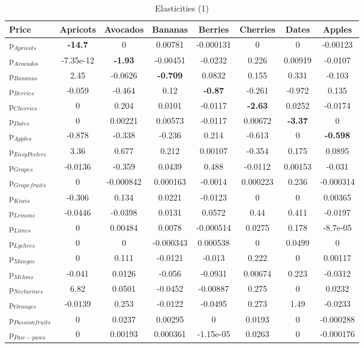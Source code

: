\documentclass[11pt]{article}
\begin{document}
\begin{table}[h]
\caption{Elasticities (1)}
\label{table:elasticities 1}
\begin{center}
\begin{tabular}{lccccccc} \hline \hline
Price &Apricots &Avocados &Bananas &Berries &Cherries &Dates &Apples \\ \hline
p$_{Apricots}$ &\textbf{-14.7} &0 &0.00781 &-0.000131 &0 &0 &-0.00123 \\
p$_{Avocados}$ &-7.35e-12 &\textbf{-1.93} &-0.00451 &-0.0232 &0.226 &0.00919 &-0.0107 \\
p$_{Bananas}$ &2.45 &-0.0626 &\textbf{-0.709} &0.0832 &0.155 &0.331 &-0.103 \\
p$_{Berries}$ &-0.059 &-0.464 &0.12 &\textbf{-0.87} &-0.261 &-0.972 &0.135 \\
p$_{Cherries}$ &0 &0.204 &0.0101 &-0.0117 &\textbf{-2.63} &0.0252 &-0.0174 \\
p$_{Dates}$ &0 &0.00221 &0.00573 &-0.0117 &0.00672 &\textbf{-3.37} &0 \\
p$_{Apples}$ &-0.878 &-0.338 &-0.236 &0.214 &-0.613 &0 &\textbf{-0.598} \\
p$_{Easy Peelers}$ &3.36 &0.677 &0.212 &0.00107 &-0.354 &0.175 &0.0895 \\
p$_{Grapes}$ &-0.0136 &-0.359 &0.0439 &0.488 &-0.0112 &0.00153 &-0.031 \\
p$_{Grapefruits}$ &0 &-0.000842 &0.000163 &-0.0014 &0.000223 &0.236 &-0.000314 \\
p$_{Kiwis}$ &-0.306 &0.134 &0.0221 &-0.0123 &0 &0 &0.00365 \\
p$_{Lemons}$ &-0.0446 &-0.0398 &0.0131 &0.0572 &0.44 &0.411 &-0.0197 \\
p$_{Limes}$ &0 &0.00484 &0.0078 &-0.000514 &0.0275 &0.178 &-8.7e-05 \\
p$_{Lychees}$ &0 &0 &-0.000343 &0.000538 &0 &0.0499 &0 \\
p$_{Mangos}$ &0 &0.111 &-0.0121 &-0.013 &0.222 &0 &0.00117 \\
p$_{Melons}$ &-0.041 &0.0126 &-0.056 &-0.0931 &0.00674 &0.223 &-0.0312 \\
p$_{Nectarines}$ &6.82 &0.0501 &-0.0452 &-0.00887 &0.275 &0 &0.0232 \\
p$_{Oranges}$ &-0.0139 &0.253 &-0.0122 &-0.0495 &0.273 &1.49 &-0.0233 \\
p$_{Passion fruits}$ &0 &0.0237 &0.00295 &0 &0.0193 &0 &-0.000288 \\
p$_{Paw-paws}$ &0 &0.00193 &0.000361 &-1.15e-05 &0.0263 &0 &-0.000176 \\

\end{tabular}
\end{center}
\end{table}
\end{document}
